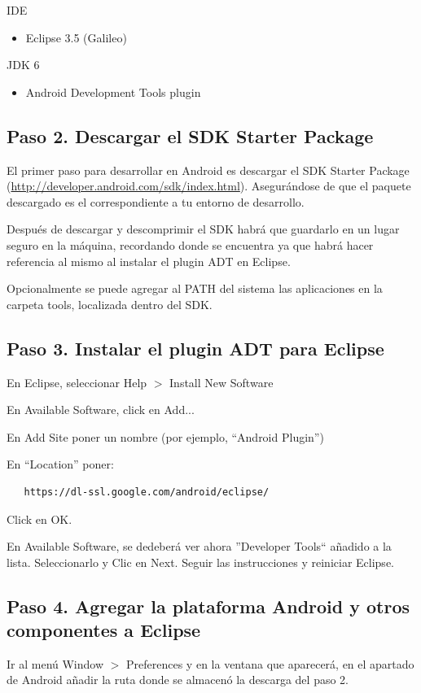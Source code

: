 \documentclass[a4paper,10pt]{article}
\begin{document}
IDE
\begin{itemize}
\item Eclipse 3.5 (Galileo)
\end{itemize}

JDK 6
\begin{itemize}
\item Android Development Tools plugin
\end{itemize}


\subsection{Paso 2. Descargar el SDK Starter Package}
El primer paso para desarrollar en Android es descargar el SDK Starter Package (\url{http://developer.android.com/sdk/index.html}). Asegurándose de que el paquete descargado es el correspondiente a tu entorno de desarrollo.

Después de descargar y descomprimir el SDK habrá que guardarlo en un lugar seguro en la máquina, recordando donde se encuentra ya que habrá hacer referencia al mismo al instalar el plugin ADT en Eclipse.

Opcionalmente se puede agregar al PATH del sistema las aplicaciones en la carpeta tools, localizada dentro del SDK.

\subsection{Paso 3. Instalar el plugin ADT para Eclipse}

En Eclipse, seleccionar Help $>$ Install New Software

En Available Software, click en Add...

En Add Site poner un nombre (por ejemplo, ``Android Plugin'')

En ``Location'' poner:

\begin{verbatim}
   https://dl-ssl.google.com/android/eclipse/
\end{verbatim}

Click en OK.

En Available Software, se dedeberá ver ahora ''Developer Tools`` añadido a la lista. Seleccionarlo y Clic en Next. Seguir las instrucciones y reiniciar Eclipse.
\subsection{Paso 4. Agregar la plataforma Android y otros componentes a Eclipse}
Ir al menú Window $>$ Preferences y en la ventana que aparecerá,  en el apartado de Android añadir la ruta donde se almacenó la descarga del paso 2.
\end{document}
